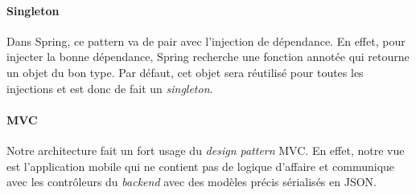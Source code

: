	\paragraph{Singleton} Dans Spring, ce pattern va de pair avec l’injection de dépendance. En effet, pour injecter la bonne dépendance, Spring recherche une fonction annotée  qui retourne un objet du bon type. Par défaut, cet objet sera réutilisé pour toutes les injections et est donc de fait un \emph{singleton}.
	\paragraph{MVC} Notre architecture fait un fort usage du \emph{design pattern} MVC. En effet, notre vue est l’application mobile qui ne contient pas de logique d’affaire et communique avec les contrôleurs du \emph{backend} avec des modèles précis sérialisés en JSON.
